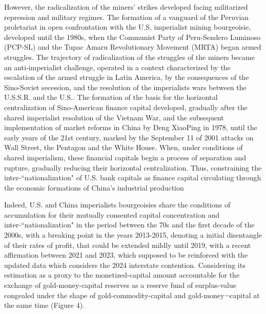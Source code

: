 \documentclass[]{interact}
\theoremstyle{plain}%
\theoremstyle{definition}
\theoremstyle{remark}
\begin{document}
However, the radicalization of the miners' strikes developed facing militarized repression and military regimes. The formation of a vanguard of the Peruvian proletariat in open confrontation with the U.S. imperialist mining bourgeoisie, developed until the 1980s, when the Communist Party of Peru-Sendero Luminoso (PCP-SL) and the Tupac Amaru Revolutionary Movement (MRTA) began armed struggles. The trajectory of radicalization of the struggles of the miners became an anti-imperialist challenge, operated in a context characterized by the escalation of the armed struggle in Latin America, by the consequences of the Sino-Soviet secession, and the resolution of the imperialists wars between the U.S.S.R. and the U.S.. The formation of the basis for the horizontal centralization of Sino-American finance capital developed, gradually after the shared imperialist resolution of the Vietnam War, and the subsequent implementation of market reforms in China by Deng XiaoPing in 1978, until the early years of the 21st century, marked by the September 11 of 2001 attacks on Wall Street, the Pentagon and the White House. When, under conditions of shared imperialism, these financial capitals begin a process of separation and rupture, gradually reducing their horizontal centralization. Thus, constraining the inter-“nationalization" of U.S. bank capitals as finance capital circulating through the economic formations of China's industrial production

Indeed, U.S. and China imperialists bourgeoisies share the conditions of accumulation for their mutually consented capital concentration and inter-“nationalization" in the period between the 70s and the first decade of the 2000s, with a breaking point in the years 2013-2015, denoting a initial disentangle of their rates of profit, that could be extended mildly until 2019, with a recent affirmation between 2021 and 2023, which supposed to be reinforced with the updated data which considers the 2024 interstate contention. Considering its estimation as a proxy to the monetized-capital amount accountable for the exchange of gold-money-capital reserves as a reserve fund of surplus-value congealed under the shape of gold-commodity-capital and gold-money¬capital at the same time (Figure 4).
\end{document}
